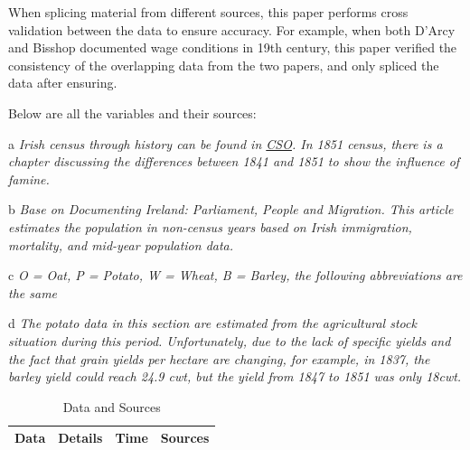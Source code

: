 When splicing material from different sources, this paper performs cross validation between the data to ensure accuracy. For example, when both D'Arcy and Bisshop documented wage conditions in 19th century, this paper verified the consistency of the overlapping data from the two papers, and only spliced the data after ensuring. 

Below are all the variables and their sources: 

\vspace{7pt}

\begin{spacing}{1}
\begin{ThreePartTable}
    \begin{TableNotes}
        \begin{spacing}{1}
        \vspace{7pt}
        \item[a] \textit{Irish census through history can be found in \href{https://www.cso.ie/en/statistics/historicalreports/}{CSO}. In 1851 census, there is a chapter discussing the differences between 1841 and 1851 to show the influence of famine.}
        \vspace{7pt}
        \item[b] \textit{Base on Documenting Ireland: Parliament, People and Migration. This article estimates the population in non-census years based on Irish immigration, mortality, and mid-year population data.}
        \vspace{7pt}
        \item[c] \textit{O = Oat, P = Potato, W = Wheat, B = Barley, the following abbreviations are the same}
        \vspace{7pt}
        \item[d] \textit{The potato data in this section are estimated from the agricultural stock situation during this period. Unfortunately, due to the lack of specific yields and the fact that grain yields per hectare are changing, for example, in 1837, the barley yield could reach 24.9 cwt, but the yield from 1847 to 1851 was only 18cwt.}
        \end{spacing}
    \end{TableNotes}
\begin{longtable}{cccc}
    \caption{Data and Sources} \\
    \toprule 
    \textbf{Data} & \textbf{Details} & \textbf{Time} & \textbf{Sources} \\
    \midrule 
    \endfirsthead


\end{longtable}
\end{ThreePartTable}
\end{spacing}
